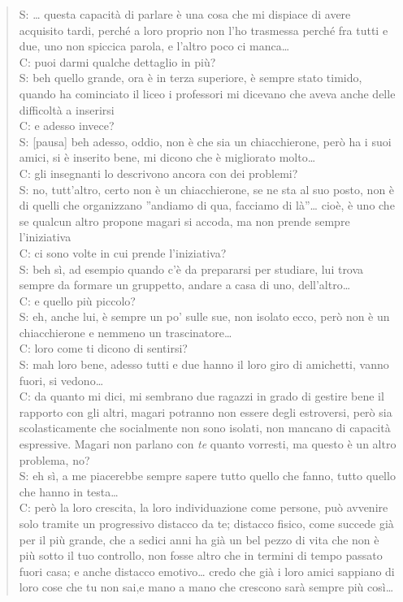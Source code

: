 \begin{verse}
S: \ldots{}   questa capacità di parlare è una cosa che mi dispiace di avere acquisito tardi, perché a loro proprio non l'ho trasmessa
perché fra tutti e due, uno non spiccica parola, e l'altro poco ci manca\ldots{}  \\
C: puoi darmi qualche dettaglio in più?\\
S: beh quello grande, ora è in terza superiore, è sempre stato timido, quando ha cominciato il liceo i professori mi dicevano che aveva anche delle difficoltà a inserirsi\\
C: e adesso invece?\\
S: [pausa] beh adesso, oddio, non è che sia un chiacchierone, però ha i suoi amici, si è inserito bene, mi dicono che è migliorato molto\ldots{}  \\
C: gli insegnanti lo descrivono ancora con dei problemi?\\
S: no, tutt'altro, certo non è un chiacchierone, se ne sta al suo posto, non è di quelli che organizzano ''andiamo di qua, facciamo di là''\ldots{}   cioè, è uno che se qualcun altro propone magari si accoda, ma non prende sempre l'iniziativa\\
C: ci sono volte in cui prende l'iniziativa?\\
S: beh sì, ad esempio quando c'è da prepararsi per studiare, lui trova sempre da formare un gruppetto, andare a casa di uno, dell'altro\ldots{}  \\
C: e quello più piccolo?\\
S: eh, anche lui, è sempre un po' sulle sue, non isolato ecco, però non è un chiacchierone e nemmeno un trascinatore\ldots{}  \\
C: loro come ti dicono di sentirsi?\\
S: mah loro bene, adesso tutti e due hanno il loro giro di amichetti, vanno fuori, si vedono\ldots{}  \\
C: da quanto mi dici, mi sembrano due ragazzi in grado di gestire bene il rapporto con gli altri, magari potranno non essere degli estroversi, però sia scolasticamente che socialmente non sono isolati, non mancano di capacità espressive. Magari non parlano con \emph{te} quanto vorresti, ma questo è un altro problema, no?\\
S: eh sì, a me piacerebbe sempre sapere tutto quello che fanno, tutto quello che hanno in testa\ldots{}  \\
C: però la loro crescita, la loro individuazione come persone, può avvenire solo tramite un progressivo distacco da te; distacco fisico, come succede già per il più grande, che a sedici anni ha già un bel pezzo di vita che non è più sotto il tuo controllo, non fosse altro che in termini di tempo passato fuori casa; e anche distacco emotivo\ldots{}   credo che già i loro amici sappiano di loro cose che tu non sai,e mano a mano che crescono sarà sempre più così\ldots{}  \\

\end{verse}
